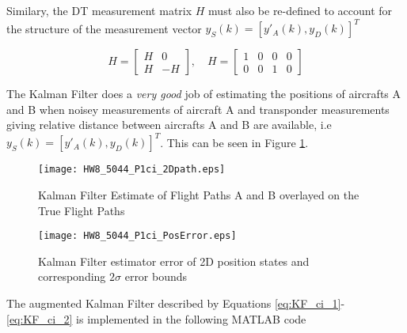 \documentclass[]{article}
\begin{document}
\noindent Similary, the DT measurement matrix $H$ must also be re-defined to account for the structure of the measurement vector $y_S(k)=[y'_A(k),y_D(k)]^T$

\begin{equation}
	H = \left[\begin{array}{cc}H & 0\\ H & -H\end{array}\right],\quad
	H = \left[\begin{array}{cccc}1 & 0 & 0 & 0\\0 & 0 & 1 & 0\end{array}\right]
	\label{eq:KF_ci_2}
\end{equation}

\noindent The Kalman Filter does a \textit{very good} job of estimating the positions of aircrafts A and B when noisey measurements of aircraft A and transponder measurements giving relative distance between aircrafts A and B are available, i.e $y_S(k)=[y'_A(k),y_D(k)]^T$. This can be seen in Figure \ref{fig:HW8_5044_P1ci_2Dpath}.

\begin{figure}[H]
	\begin{center}  
		\texttt{[image: HW8\_5044\_P1ci\_2Dpath.eps]}  
		\caption{Kalman Filter Estimate of Flight Paths A and B overlayed on the True Flight Paths}
		\label{fig:HW8_5044_P1ci_2Dpath}
	\end{center}  
\end{figure}

\begin{figure}[H]
	\begin{center}  
		\texttt{[image: HW8\_5044\_P1ci\_PosError.eps]}  
		\caption{Kalman Filter estimator error of 2D position states and corresponding $2\sigma$ error bounds}
		\label{fig:HW8_5044_P1ci_PosError}
	\end{center}  
\end{figure}

\noindent The augmented Kalman Filter described by Equations \ref{eq:KF_ci_1}-\ref{eq:KF_ci_2} is implemented in the following MATLAB code
\end{document}
